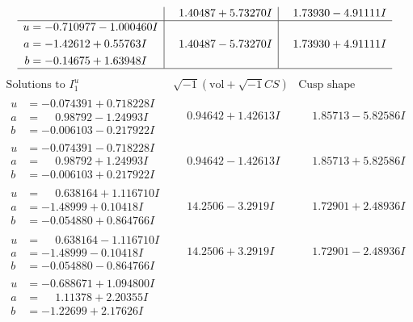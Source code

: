 \documentclass[1p]{elsarticle_modified}
\theoremstyle{definition}
\newcommand{\I}{\sqrt{-1}}
\begin{document}
$$\begin{array}{c|c|c}
 & \phantom{-}1.40487 + 5.73270 I & \phantom{-}1.73930 - 4.91111 I \\ \hline\begin{aligned}
u &= -0.710977 - 1.000460 I \\
a &= -1.42612 + 0.55763 I \\
b &= -0.14675 + 1.63948 I\end{aligned}
 & \phantom{-}1.40487 - 5.73270 I & \phantom{-}1.73930 + 4.91111 I\\
 \hline 
 \end{array}$$\newpage$$\begin{array}{c|c|c}  
\text{Solutions to }I^u_{1}& \I (\text{vol} + \sqrt{-1}CS) & \text{Cusp shape}\\
 \hline 
\begin{aligned}
u &= -0.074391 + 0.718228 I \\
a &= \phantom{-}0.98792 - 1.24993 I \\
b &= -0.006103 - 0.217922 I\end{aligned}
 & \phantom{-}0.94642 + 1.42613 I & \phantom{-}1.85713 - 5.82586 I \\ \hline\begin{aligned}
u &= -0.074391 - 0.718228 I \\
a &= \phantom{-}0.98792 + 1.24993 I \\
b &= -0.006103 + 0.217922 I\end{aligned}
 & \phantom{-}0.94642 - 1.42613 I & \phantom{-}1.85713 + 5.82586 I \\ \hline\begin{aligned}
u &= \phantom{-}0.638164 + 1.116710 I \\
a &= -1.48999 + 0.10418 I \\
b &= -0.054880 + 0.864766 I\end{aligned}
 & \phantom{-}14.2506 - 3.2919 I & \phantom{-}1.72901 + 2.48936 I \\ \hline\begin{aligned}
u &= \phantom{-}0.638164 - 1.116710 I \\
a &= -1.48999 - 0.10418 I \\
b &= -0.054880 - 0.864766 I\end{aligned}
 & \phantom{-}14.2506 + 3.2919 I & \phantom{-}1.72901 - 2.48936 I \\ \hline\begin{aligned}
u &= -0.688671 + 1.094800 I \\
a &= \phantom{-}1.11378 + 2.20355 I \\
b &= -1.22699 + 2.17626 I\end{aligned}

\end{array}$$
\end{document}
